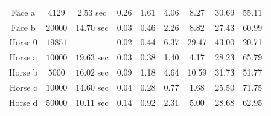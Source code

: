 \documentclass[letter,11pt]{article}
\begin{document}
\begin{table}
\begin{tabular}{*9c}
    Face a &$4129$ &$2.53$ sec
    &$0.26$ &$1.61$ &$4.06$ &$8.27$ &$30.69$ &$55.11$ \\
    Face b &$20000$ &$14.70$ sec
    &$0.03$ &$0.46$ &$2.26$ &$8.82$ &$27.43$ &$60.99$ \\
    \hline
    Horse 0 &$19851$ &---
    &0.02   &0.44   &6.37  &29.47  &43.00  &20.71 \\
    Horse a &$10000$ &$19.63$ sec
    &0.03 &0.38  &1.40  &4.17  &28.23  &65.79  \\
    Horse b &$5000$ &$16.02$ sec
    &0.09   &1.18   &4.64   &10.59  &31.73   &51.77 \\
    Horse c &$10000$ &$14.60$ sec
    &0.04 &0.28 &0.77 &1.68 &25.50 &71.75 \\
    Horse d &$50000$ &$10.11$ sec
    &0.14  &0.92 &2.31  &5.00 &28.68  &62.95 \\
    \hline
  \end{tabular}
\end{table}
\end{document}
